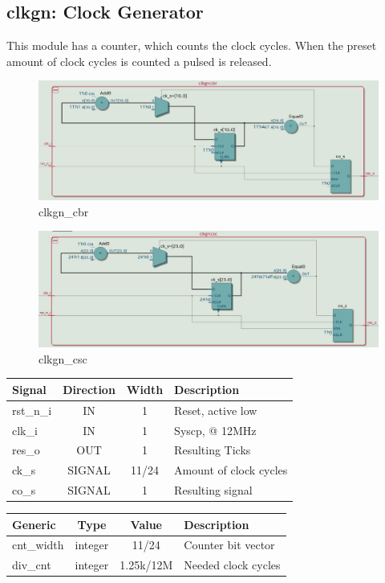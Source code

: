 \documentclass[12pt,a4 paper] {report}
\begin{document}
\subsection{clkgn: Clock Generator}
This module has a counter, which counts the clock cycles. When the preset amount of clock cycles is counted a pulsed 
is released.
\begin{figure}[h]
	\centering	
	\includegraphics[scale=0.2]{../png/clkgn_cbr.png}
	\caption{clkgn\_cbr}
\end{figure}
\begin{figure}[h]
	\centering	
	\includegraphics[scale=0.2]{../png/clkgn_csc.png}
	\caption{clkgn\_csc}
\end{figure}
\begin{center}
	\begin{tabular}{ | p{2cm} | c | c | p{5cm} |}
		\hline
		\textbf{Signal} & \textbf{Direction} & \textbf{Width} & \textbf{Description} \\
		\hline
		\hline
		rst\_n\_i & IN & 1 & Reset, active low \\
		\hline
		clk\_i & IN & 1 & Syscp, @ 12MHz \\
		\hline
		res\_o & OUT & 1 & Resulting Ticks \\
		\hline
		\hline
		ck\_s & SIGNAL & 11/24 & Amount of clock cycles \\
		\hline
		co\_s & SIGNAL & 1 & Resulting signal \\
		\hline
	\end{tabular}
\end{center}
\begin{center}
	\begin{tabular}{| p{2cm} | c | c | p{5cm} |}
	\hline
	\textbf{Generic} & \textbf{Type} & \textbf{Value} & \textbf{Description} \\
	\hline
	cnt\_width & integer & 11/24 & Counter bit vector \\
	\hline
	div\_cnt & integer & 1.25k/12M & Needed clock cycles \\	
	\hline
	\end{tabular}
\end{center}
\end{document}
